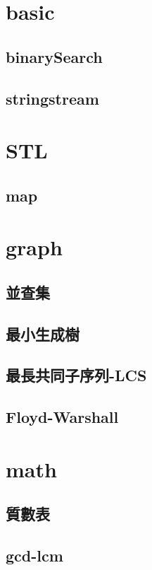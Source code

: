 \section{basic}
    \subsection{binarySearch}
        
    \subsection{stringstream}
        
\section{STL}
    \subsection{map}
        
\section{graph}
    \subsection{並查集}
        
    \subsection{最小生成樹}
        
    \subsection{最長共同子序列-LCS}
        
    \subsection{Floyd-Warshall}
        
\section{math}
    \subsection{質數表}
        
    \subsection{gcd-lcm}
        